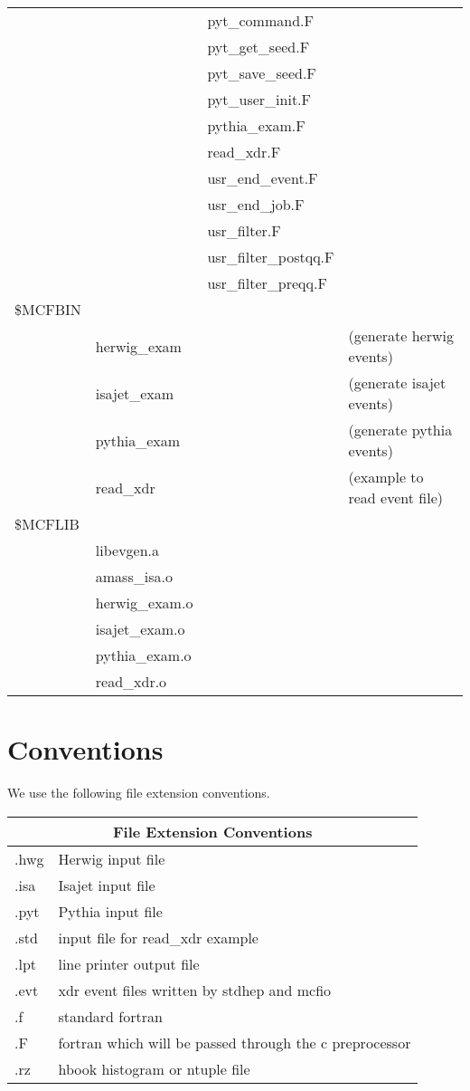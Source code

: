 \begin{tabular}{|llll|}
  &    &  pyt\_command.F & \\
  &    &  pyt\_get\_seed.F & \\
  &    &  pyt\_save\_seed.F & \\
  &    &  pyt\_user\_init.F & \\
  &    &  pythia\_exam.F & \\
  &    &  read\_xdr.F & \\
  &    &  usr\_end\_event.F & \\
  &    &  usr\_end\_job.F & \\
  &    &  usr\_filter.F & \\
  &    &  usr\_filter\_postqq.F & \\
  &    &  usr\_filter\_preqq.F & \\
\$MCFBIN  &    &     &    	\\
  &     herwig\_exam  & &  (generate herwig events) \\
  &     isajet\_exam  & &  (generate isajet events) \\
  &     pythia\_exam  & &  (generate pythia events) \\
  &     read\_xdr  & &  (example to read event file) \\
\$MCFLIB  &    &     &    	\\
  &  libevgen.a  &    &   \\
  & amass\_isa.o  &    &   \\
  & herwig\_exam.o  &    &   \\
  & isajet\_exam.o  &    &   \\
  & pythia\_exam.o  &    &   \\
  & read\_xdr.o  &    &   \\ \hline
\end{tabular}
\normalsize

\newpage

\section{Conventions}

We use the following file extension conventions.

\vspace{0.2 in}

\begin{tabular}{|l|l|} \hline
\multicolumn{2}{|c|}{File Extension Conventions} \\ \hline
 .hwg  & Herwig input file \\ \hline
 .isa  & Isajet input file \\ \hline
 .pyt  & Pythia input file \\ \hline
 .std  & input file for read\_xdr example \\ \hline
 .lpt  & line printer output file \\ \hline
 .evt  & xdr event files written by stdhep and mcfio \\ \hline
 .f  & standard fortran \\ \hline
 .F  & fortran which will be passed through the c preprocessor \\ \hline
 .rz  & hbook histogram or ntuple file \\ \hline
\end{tabular}

